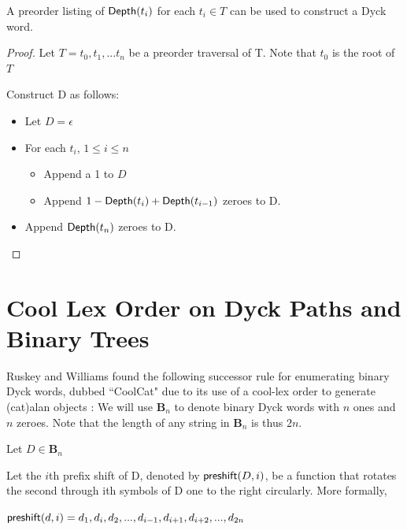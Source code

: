 

\begin{remark}A preorder listing of $\mathsf{Depth}{(t_i)} $ for each $ t_i \in T$ can be used to construct a Dyck word. \label{re:construct_dyck}

\end{remark} 
\begin{proof}

    Let $T=t_0,t_1,...t_n$ be a preorder traversal of T.  Note that $t_0$ is the root of $T$

    Construct D as follows: 

    \begin{itemize}
	\item Let $D=\epsilon$ %
	\item For each $t_i$, $1\le i \le n$
	    \begin{itemize}
		\item Append a 1 to $D$
		\item Append $1-\mathsf{Depth}{(t_{i})}+\mathsf{Depth}{(t_{i-1})}$ zeroes to D.
	    \end{itemize}
	\item Append $\mathsf{Depth}{(t_{n})}$ zeroes to D. 
    \end{itemize}
\end{proof} 

\section{Cool Lex Order on Dyck Paths and Binary Trees}
Ruskey and Williams found the following successor rule for enumerating binary Dyck words, dubbed ``CoolCat" due to its use of a cool-lex order to generate (cat)alan objects \cite{ruskey2008generating}:
We will use $\mathbf{B}_n$ to denote binary Dyck words with $n$ ones and $n$ zeroes.  Note that the length of any string in $\mathbf{B}_n$ is thus $2n$.

\noindent Let $D \in \mathbf{B}_n$

\noindent Let the $i$th prefix shift of D, denoted by $\mathsf{preshift(} D, i \mathsf{)}$, be a function that rotates the second through ith symbols of D one to the right circularly.  More formally, 

\noindent $\mathsf{preshift(} d, i \mathsf{)}=d_1,d_i,d_2,...,d_{i-1},d_{i+1},d_{i+2},...,d_{2n}$


